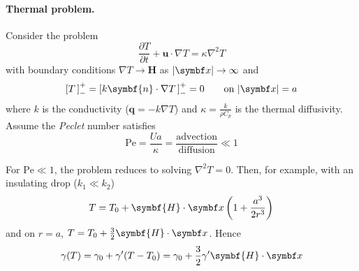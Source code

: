 \documentclass{jknotes}
\begin{document}
\paragraph{Thermal problem.}
Consider the problem
\begin{equation}
	\frac{\partial T}{\partial t} + \symbf{u} \cdot \nabla T = \kappa \nabla^2 T
\end{equation}
with boundary conditions $\nabla T \to \symbf{H}$ as $\abs{\x} \to \infty$ and
\begin{equation}
	\left[ T\,\right]^+_- = \left[ k \symbf{n} \cdot \nabla T\,\right]^+_- = 0
	\hspace{2em} \text{on} \,\, \abs{\x} = a
\end{equation}
where $k$ is the conductivity ($\symbf{q} = -k \nabla T$) and $\kappa =
\frac{k}{\rho C_p}$ is the thermal diffusivity. Assume the \emph{Peclet}
number satisfies
\begin{equation}
	\text{Pe} = \frac{U a}{\kappa} = \frac{\text{advection}}{\text{diffusion}}
	\ll 1
\end{equation}

For $\text{Pe} \ll 1$, the problem reduces to solving $\nabla^2 T = 0$. Then,
for example, with an insulating drop ($k_1 \ll k_2$)
\begin{equation}
	T = T_0 + \symbf{H}\cdot\x \left(1+\frac{a^3}{2r^3}\right)
\end{equation}
and on $r =a$, $T = T_0 + \frac{3}{2}\symbf{H}\cdot\x$. Hence
\begin{equation}
	\gamma(T) = \gamma_0 + \gamma' (T-T_0) = \gamma_0 + \frac{3}{2}\gamma'
	\symbf{H}\cdot\x
\end{equation}
\end{document}
